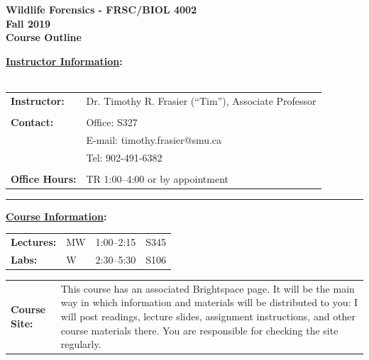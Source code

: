\documentclass[hidelinks]{article}
\begin{document}
\vspace*{0.01cm}

\begin{center}
	\Large{\textbf{Wildlife Forensics - FRSC/BIOL 4002\\
	Fall 2019\\
	Course Outline}}
\end{center}


\textbf{\underline{Instructor Information}:}\\
\\
	\begin{tabular}{@{} p{2.3cm} l }
		\textbf{Instructor:}	& Dr. Timothy R. Frasier (``Tim''), Associate Professor\\
		\\
		\textbf{Contact:} 	& Office: S327\\
					& E-mail: timothy.frasier@smu.ca\\
					& Tel: 902-491-6382\\
		\\
		\textbf{Office Hours:} & TR 1:00--4:00 or by appointment				
	\end{tabular}

	\begin{center}
		\rule{4cm}{0.5pt}
	\end{center}


\textbf{\underline{Course Information}:}


	\begin{tabular}{@{} p{2.3cm} l l l}
		\textbf{Lectures:} & MW & 1:00--2:15 & S345\\
		\textbf{Labs:} & W & 2:30--5:30 & S106\\
	\end{tabular}
	
	
	\begin{tabular}{@{} p{2.3cm} p{13.9cm}}
		\textbf{Course Site:} & This course has an associated Brightspace page. It will be the main way in which information and materials will be distributed to you: I will post readings, lecture slides, assignment instructions, and other course materials there. You are responsible for checking the site regularly.\\
	\end{tabular}
\end{document}
